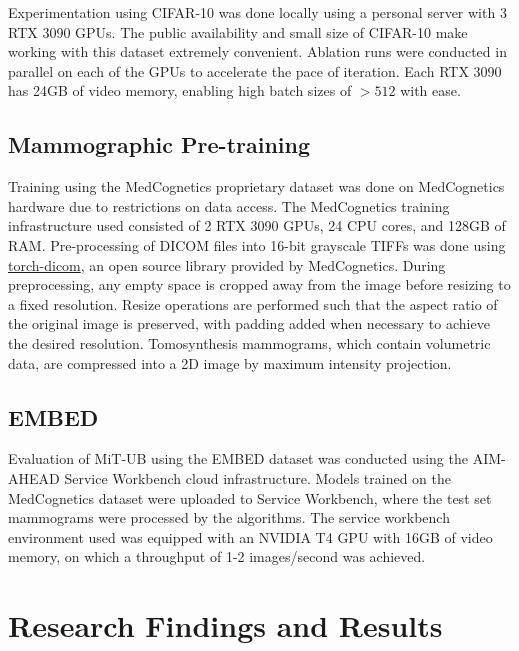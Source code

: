 \documentclass[12pt]{article}
\begin{document}
Experimentation using CIFAR-10 was done locally using a personal server with 3 RTX 3090 GPUs. The public availability and small size of CIFAR-10 make working
with this dataset extremely convenient. Ablation runs were conducted in parallel on each of the GPUs to accelerate the pace of iteration. Each RTX 3090 has 24GB of
video memory, enabling high batch sizes of $> 512$ with ease. 


\subsection{Mammographic Pre-training}

Training using the MedCognetics proprietary dataset was done on MedCognetics hardware due to restrictions on data access. The MedCognetics training infrastructure
used consisted of 2 RTX 3090 GPUs, 24 CPU cores, and 128GB of RAM. Pre-processing of DICOM files
into 16-bit grayscale TIFFs was done using \href{https://github.com/medcognetics/torch-dicom}{torch-dicom}, an open source library provided by MedCognetics.
During preprocessing, any empty space is cropped away from the image before resizing to a fixed resolution. Resize operations are performed such that the aspect
ratio of the original image is preserved, with padding added when necessary to achieve the desired resolution. Tomosynthesis mammograms, which contain volumetric
data, are compressed into a 2D image by maximum intensity projection.

\subsection{EMBED}

Evaluation of MiT-UB using the EMBED dataset was conducted using the AIM-AHEAD Service Workbench cloud infrastructure. 
Models trained on the MedCognetics dataset were uploaded to Service Workbench, where the test set mammograms were processed
by the algorithms. The service workbench environment used was equipped with an NVIDIA T4 GPU with 16GB of video memory, on which a throughput of 1-2 images/second was achieved.


\section{Research Findings and Results}
\noindent
\end{document}
